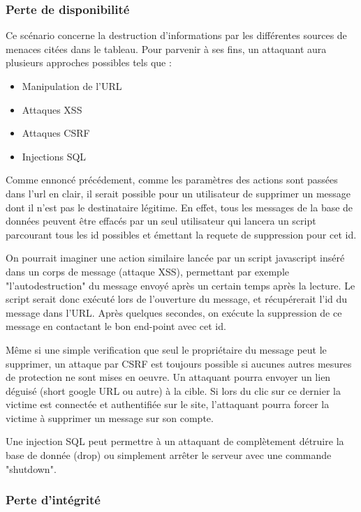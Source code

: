 \documentclass[12pt]{article}
\begin{document}
\subsubsection{Perte de disponibilité} \label{2}

Ce scénario concerne la destruction d'informations par les différentes sources de menaces citées dans le tableau. Pour parvenir à ses fins, un attaquant aura plusieurs approches possibles tels que : 

\begin{itemize}
\item Manipulation de l'URL
\item Attaques XSS
\item Attaques CSRF
\item Injections SQL
\end{itemize}

Comme ennoncé précédement, comme les paramètres des actions sont passées dans l'url en clair, il serait possible pour un utilisateur de supprimer un message dont il n'est pas le destinataire légitime. En effet, tous les messages de la base de données peuvent être effacés par un seul utilisateur qui lancera un script parcourant tous les id possibles et émettant la requete de suppression pour cet id.

On pourrait imaginer une action similaire lancée par un script javascript inséré dans un corps de message (attaque XSS), permettant par exemple "l'autodestruction" du message envoyé après un certain temps après la lecture. Le script serait donc exécuté lors de l'ouverture du message, et récupérerait l'id du message dans l'URL. Après quelques secondes, on exécute la suppression de ce message en contactant le bon end-point avec cet id.

Même si une simple verification que seul le propriétaire du message peut le supprimer, un attaque par CSRF est toujours possible si aucunes autres mesures de protection ne sont mises en oeuvre. Un attaquant pourra envoyer un lien déguisé (short google URL ou autre) à la cible. Si lors du clic sur ce dernier la victime est connectée et authentifiée sur le site, l'attaquant pourra forcer la victime à supprimer un message sur son compte.

Une injection SQL peut permettre à un attaquant de complètement détruire la base de donnée (drop) ou simplement arrêter le serveur avec une commande "shutdown".

\subsubsection{Perte d'intégrité} \label{3}
\end{document}
